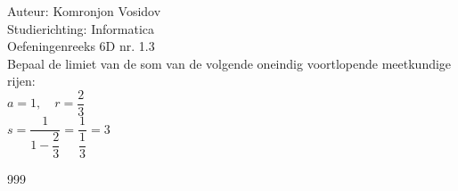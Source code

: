 \documentclass[a4paper]{article}
\begin{document}
	
	\noindent \large Auteur: Komronjon Vosidov \\
	\noindent \large Studierichting: Informatica\\
	\noindent \large Oefeningenreeks 6D nr. 1.3\\
	
	
	\medskip
	\normalsize
	Bepaal de limiet van de som van de volgende oneindig voortlopende meetkundige rijen:\\
	
	$a = 1,\quad r = \dfrac{2}{3}$\\
	
	$s = \dfrac{1}{1 - \dfrac{2}{3}} = \dfrac{1}{\dfrac{1}{3}} = 3$
	
	
	
	
	
	
	
	\begin{thebibliography}{999}
	\end{thebibliography}		
\end{document}
